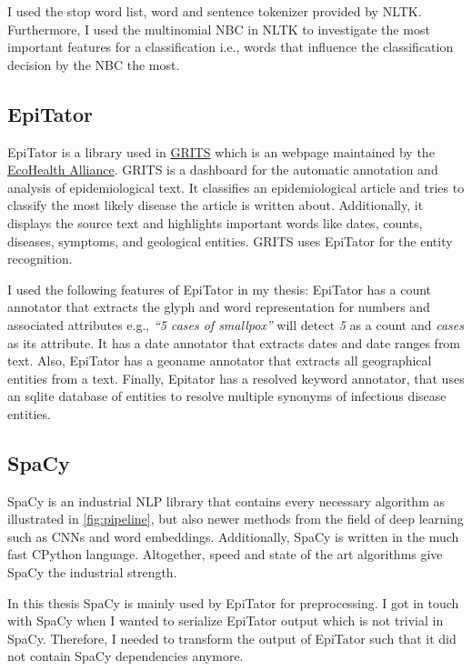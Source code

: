 I used the stop word list, word and sentence tokenizer provided by NLTK.
Furthermore, I used the multinomial NBC in NLTK to investigate the most important features for a classification i.e., words that influence the classification decision by the NBC the most.

\subsection{EpiTator}
EpiTator is a library used in \href{https://grits.eha.io}{GRITS} which is an webpage maintained by the \href{https://www.ecohealthalliance.org}{EcoHealth Alliance}.
GRITS is a dashboard for the automatic annotation and analysis of epidemiological text.
It classifies an epidemiological article and tries to classify the most likely disease the article is written about.
Additionally, it displays the source text and highlights important words like dates, counts, diseases, symptoms, and geological entities.
GRITS uses EpiTator for the entity recognition.

I used the following features of EpiTator in my thesis: EpiTator has a count annotator that extracts the glyph and word representation for numbers and associated attributes e.g., \textit{``5 cases of smallpox''} will detect \textit{5} as a count and \textit{cases} as its attribute.
It has a date annotator that extracts dates and date ranges from text.
Also, EpiTator has a geoname annotator that extracts all geographical entities from a text. Finally, Epitator has a resolved keyword annotator, that uses an sqlite database of entities to resolve multiple synonyms of infectious disease entities.

\subsection{SpaCy}
SpaCy is an industrial NLP library that contains every necessary algorithm as illustrated in \ref{fig:pipeline}, but also newer methods from the field of deep learning such as CNNs and word embeddings. Additionally, SpaCy is written in the much fast CPython language. Altogether, speed and state of the art algorithms give SpaCy the industrial strength.

In this thesis SpaCy is mainly used by EpiTator for preprocessing. I got in touch with SpaCy when I wanted to serialize EpiTator output which is not trivial in SpaCy. Therefore, I needed to transform the output of EpiTator such that it did not contain SpaCy dependencies anymore.

